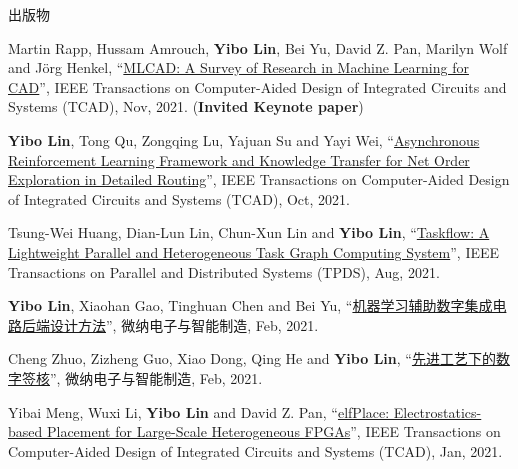 \begin{rSection}{出版物}
\begin{description}[font=\normalfont, rightmargin=2em]
{}
            

\item[{[J32]}]{
        Martin Rapp, Hussam Amrouch, \textbf{Yibo Lin}, Bei Yu, David Z. Pan, Marilyn Wolf and Jörg Henkel, 
    ``\href{https://doi.org/10.1109/TCAD.2021.3124762}{MLCAD: A Survey of Research in Machine Learning for CAD}'', 
    IEEE Transactions on Computer-Aided Design of Integrated Circuits and Systems (TCAD), Nov, 2021.
    (\textbf{Invited Keynote paper})
}
            

\item[{[J31]}]{
        \textbf{Yibo Lin}, Tong Qu, Zongqing Lu, Yajuan Su and Yayi Wei, 
    ``\href{https://doi.org/10.1109/TCAD.2021.3117505}{Asynchronous Reinforcement Learning Framework and Knowledge Transfer for Net Order Exploration in Detailed Routing}'', 
    IEEE Transactions on Computer-Aided Design of Integrated Circuits and Systems (TCAD), Oct, 2021.
    
}
            

\item[{[J30]}]{
        Tsung-Wei Huang, Dian-Lun Lin, Chun-Xun Lin and \textbf{Yibo Lin}, 
    ``\href{https://doi.org/10.1109/TPDS.2021.3104255}{Taskflow: A Lightweight Parallel and Heterogeneous Task Graph Computing System}'', 
    IEEE Transactions on Parallel and Distributed Systems (TPDS), Aug, 2021.
    
}
            

\item[{[J29]}]{
        \textbf{Yibo Lin}, Xiaohan Gao, Tinghuan Chen and Bei Yu, 
    ``\href{https://doi.org/10.19816/j.cnki.10-1594/tn.2021.02.011}{机器学习辅助数字集成电路后端设计方法}'', 
    微纳电子与智能制造, Feb, 2021.
    
}
            

\item[{[J28]}]{
        Cheng Zhuo, Zizheng Guo, Xiao Dong, Qing He and \textbf{Yibo Lin}, 
    ``\href{https://doi.org/ 10.19816/j.cnki.10-1594/tn.2021.02.001}{先进工艺下的数字签核}'', 
    微纳电子与智能制造, Feb, 2021.
    
}
            

\item[{[J27]}]{
        Yibai Meng, Wuxi Li, \textbf{Yibo Lin} and David Z. Pan, 
    ``\href{https://doi.org/10.1109/TCAD.2021.3053191}{elfPlace: Electrostatics-based Placement for Large-Scale Heterogeneous FPGAs}'', 
    IEEE Transactions on Computer-Aided Design of Integrated Circuits and Systems (TCAD), Jan, 2021.
    
}
\end{description}
\end{rSection}
